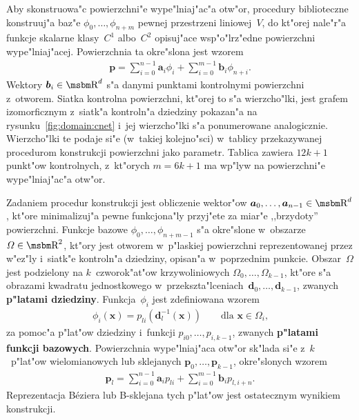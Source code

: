 Aby skonstruowa"c powierzchni"e wype"lniaj"ac"a otw"or, procedury
biblioteczne konstruuj"a baz"e $\phi_0,\ldots,\phi_{n+m}$ pewnej
przestrzeni liniowej~$V$, do kt"orej nale"r"a funkcje skalarne klasy~$C^1$
albo~$C^2$ opisuj"ace wsp"o"lrz"edne powierzchni wype"lniaj"acej.
Powierzchnia ta okre"slona jest wzorem
\begin{align}\label{eq:G2:surface}
  \bm{p} =
  \sum_{i=0}^{n-1}\bm{a}_i\phi_i+\sum_{i=0}^{m-1}\bm{b}_i\phi_{n+i}.
\end{align}
Wektory $\bm{b}_i\in\R^d$ s"a danymi punktami kontrolnymi powierzchni
z~otworem. Siatka kontrolna powierzchni, kt"orej to s"a wierzcho"lki,
jest grafem izomorficznym z~siatk"a kontroln"a dziedziny pokazan"a na
rysunku~\ref{fig:domain:cnet} i~jej wierzcho"lki s"a ponumerowane
analogicznie. Wierzcho"lki te podaje si"e (w~takiej kolejno"sci)
w~tablicy przekazywanej procedurom konstrukcji powierzchni jako parametr.
Tablica zawiera $12k+1$ punkt"ow kontrolnych, z~kt"orych $m=6k+1$
ma wp"lyw na powierzchni"e wype"lniaj"ac"a otw"or.

\begin{sloppypar}
Zadaniem procedur konstrukcji jest obliczenie wektor"ow
$\bm{a}_0,\ldots,\bm{a}_{n-1}\in\R^d$, kt"ore minimalizuj"a pewne
funkcjona"ly przyj"ete za miar"e ,,brzydoty'' powierzchni.
Funkcje bazowe $\phi_0,\ldots,\phi_{n+m-1}$ s"a okre"slone w~obszarze
$\varOmega\in\R^2$, kt"ory jest otworem w~p"las\-kiej powierzchni
reprezentowanej przez w"ez"ly i~siatk"e kontroln"a dziedziny, opisan"a
w~poprzednim punkcie. Obszar~$\varOmega$ jest podzielony na
$k$~czworok"at"ow krzywoliniowych $\varOmega_0,\ldots,\varOmega_{k-1}$,
kt"ore s"a obrazami kwadratu jednostkowego
w~przekszta"lceniach~$\bm{d}_0,\ldots,\bm{d}_{k-1}$, zwanych
\textbf{p"latami dziedziny}. Funkcja~$\phi_i$ jest zdefiniowana wzorem
\begin{align*}
  \phi_i(\bm{x}) = p_{li}(\bm{d}_l^{-1}(\bm{x}))\qquad
  \mbox{dla $\bm{x}\in\varOmega_i$,}
\end{align*}
za pomoc"a p"lat"ow dziedziny i~funkcji $p_{i0},\ldots,p_{i,k-1}$,
zwanych \textbf{p"latami funkcji bazowych}. Powierzchnia wype"lniaj"aca
otw"or sk"lada si"e z~$k$~p"lat"ow wielomianowych lub sklejanych
$\bm{p}_0,\ldots,\bm{p}_{k-1}$, okre"slonych wzorem
\begin{align*}
  \bm{p}_l =
  \sum_{i=0}^{n-1}\bm{a}_ip_{li}+\sum_{i=0}^{m-1}\bm{b}_ip_{l,i+n}.
\end{align*}
Reprezentacja B\'{e}ziera lub B-sklejana tych p"lat"ow jest ostatecznym
wynikiem konstrukcji.%
\end{sloppypar}

